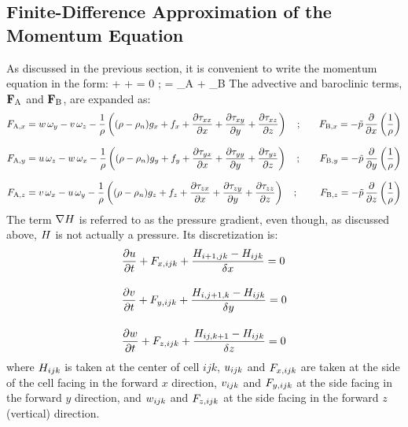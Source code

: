 \subsection{Finite-Difference Approximation of the Momentum Equation}
\label{findiffmom}

As discussed in the previous section, it is convenient to write the momentum equation in the form:
\be
    + \bF + \nabla \cH = 0 \quad ; \quad \bF = \bF_{\rm A} + \bF_{\rm B} \label{simple_momentum_equation}
\ee
The advective and baroclinic terms, ${\mathbf{F}}_{\rm A}$ and ${\mathbf{F}}_{\rm B}$, are expanded as:
\begin{align}
F_{{\rm A},x} &= w \, \omega_y - v \, \omega_z  - \frac{1}{\rho} \left( (\rho-\rho_n)g_x + f_x  +  \frac{\partial \tau_{xx}}{\partial x} + \frac{\partial \tau_{xy}}{\partial y} + \frac{\partial \tau_{xz}}{\partial z} \right) \quad ; \quad & F_{{\rm B},x} = -\tilde{p} \, \frac{\partial }{\partial x} \left( \frac{1}{\rho} \right) \\[0.1in]
F_{{\rm A},y} &= u \, \omega_z - w \, \omega_x  - \frac{1}{\rho} \left( (\rho-\rho_n)g_y + f_y  +  \frac{\partial \tau_{yx}}{\partial x} + \frac{\partial \tau_{yy}}{\partial y} + \frac{\partial \tau_{yz}}{\partial z} \right) \quad ; \quad & F_{{\rm B},y} = -\tilde{p} \, \frac{\partial }{\partial y} \left( \frac{1}{\rho} \right) \\[0.1in]
F_{{\rm A},z} &= v \, \omega_x - u \, \omega_y  - \frac{1}{\rho} \left( (\rho-\rho_n)g_z + f_z  +  \frac{\partial \tau_{zx}}{\partial x} + \frac{\partial \tau_{zy}}{\partial y} + \frac{\partial \tau_{zz}}{\partial z} \right) \quad ; \quad & F_{{\rm B},z} = -\tilde{p} \, \frac{\partial }{\partial z} \left( \frac{1}{\rho} \right)
\end{align}
The term $\nabla H$ is referred to as the pressure gradient, even though, as discussed above, $H$ is not actually a pressure. Its discretization is:
\begin{align}
&\frac{\partial u}{\partial t} + F_{x,ijk} + \frac{H_{i+1,jk} -H_{ijk}}{\delta x}  = 0  \label{umom} \\[0.15in]
&\frac{\partial v}{\partial t} + F_{y,ijk} + \frac{H_{i,j+1,k}-H_{ijk}}{\delta y}  = 0  \label{vmom} \\[0.15in]
&\frac{\partial w}{\partial t} + F_{z,ijk} + \frac{H_{ij,k+1} -H_{ijk}}{\delta z}  = 0  \label{wmom}
\end{align}
where $H_{ijk}$ is taken at the center of cell $ijk$, $u_{ijk}$ and $F_{x,ijk}$ are taken at the side of the cell facing in the forward $x$ direction, $v_{ijk}$ and $F_{y,ijk}$ at the side facing in the forward $y$ direction, and $w_{ijk}$ and $F_{z,ijk}$ at the side facing in the forward $z$ (vertical) direction.

